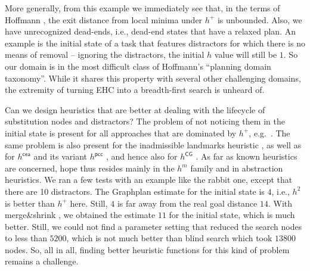 More generally, from this example we immediately see that, in the
terms of Hoffmann , the exit distance from
local minima under $h^+$ is unbounded. Also, we have unrecognized
dead-ends, i.e., dead-end states that have a relaxed plan. An example
is the initial state of a task that features distractors for which
there is no means of removal -- ignoring the distractors, the initial
$h$ value will still be $1$. So our domain is in the most difficult
class of Hoffmann's  ``planning domain
taxonomy''. While it shares this property with several other
challenging domains, the extremity of turning EHC into a breadth-first
search is unheard of.


Can we design heuristics that are better at dealing with the lifecycle
of substitution nodes and distractors? The problem of not noticing
them in the initial state is present for all approaches that are
dominated by $h^+$,
e.g.\ \cite{karpas:domshlak-ijcai-09,helmert:domshlak:icaps-09}. The
same problem is also present for the inadmissible landmarks heuristic
\cite{richter:etal:aaai-08}, as well as for $h^{\mathsf{cea}}$
\cite{helmert:geffner:icaps-08} and its variant $h^{\mathsf{pcc}}$
\cite{cai:etal:icaps-09}, and hence also for $h^{\mathsf{CG}}$
\cite{helmert:icaps-04}. As far as known heuristics are concerned,
hope thus resides mainly in the $h^m$ family and in abstraction
heuristics. We ran a few tests with an example like the rabbit one,
except that there are 10 distractors. The Graphplan estimate for the
initial state is $4$, i.e., $h^2$ is better than $h^+$ here. Still,
$4$ is far away from the real goal distance $14$. %
With merge\&shrink \cite{helmert:etal:icaps07}, we obtained the
estimate $11$ for the initial state, which is much better. Still, we
could not find a parameter setting that reduced the search nodes to
less than $5200$, which is not much better than blind search which
took $13800$ nodes. So, all in all, finding better heuristic functions
for this kind of problem remains a challenge.







